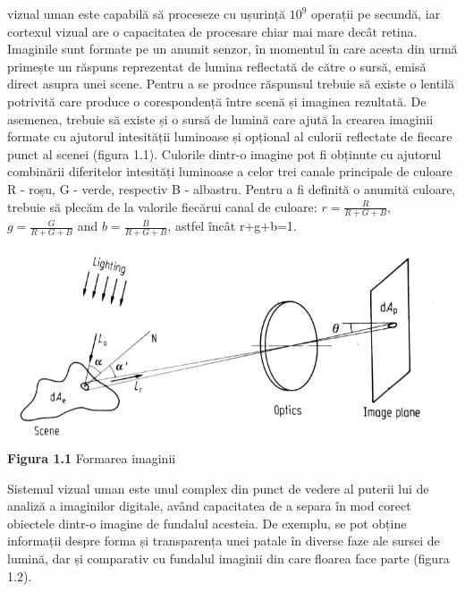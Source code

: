 \documentclass[a4paper,12pt]{report}
\newcommand\tab[1][1cm]{\hspace*{#1}}
\begin{document}
vizual uman este capabilă să proceseze cu ușurință $10^{9}$ operații pe secundă, iar cortexul vizual are o capacitatea de procesare chiar mai mare  decât retina.
\newline \tab Imaginile sunt formate pe un anumit senzor, în momentul în care acesta din urmă primește un răspuns reprezentat de lumina reflectată de către o sursă,
emisă direct asupra unei scene. Pentru a se produce răspunsul trebuie să existe o lentilă potrivită care produce o corespondență între scenă și imaginea rezultată.
De asemenea, trebuie să existe și o sursă de lumină care ajută la crearea imaginii formate cu ajutorul intesității luminoase și opțional al culorii reflectate de fiecare punct al scenei 
(figura 1.1).
\newline \tab Culorile dintr-o imagine pot fi obținute cu ajutorul combinării diferitelor intesități luminoase a celor trei canale principale de culoare R - roșu, G - verde, respectiv B - albastru.
Pentru a fi definită o anumită culoare, trebuie să plecăm de la valorile fiecărui canal de culoare: $r= \frac{R}{R+G+B}$, $g= \frac{G}{R+G+B}$ and $b= \frac{B}{R+G+B}$, astfel încât
r+g+b=1.  
\newline
\begin {center} 
	\begin {footnotesize} 
		\includegraphics[width =130mm]{fig1_1} \\
		\textbf  {Figura 1.1} Formarea imaginii
	\end {footnotesize} 
\end {center}
\tab Sistemul vizual uman este unul complex din punct de vedere al puterii lui de analiză a imaginilor digitale, având capacitatea de a separa în mod corect obiectele dintr-o imagine de
fundalul acesteia. De exemplu, se pot obține informații despre forma și transparența unei patale în diverse faze ale sursei de lumină, dar și comparativ cu fundalul imaginii din care floarea
face parte (figura 1.2).
\newline
\end{document}
